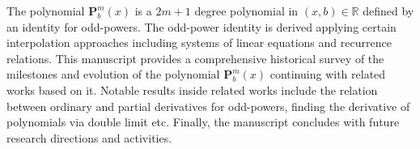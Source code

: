 The polynomial $\mathbf{P}^m_b(x)$ is a $2m+1$ degree polynomial in $(x,b) \in \mathbb{R}$
defined by an identity for odd-powers.
The odd-power identity is derived applying certain interpolation approaches
including systems of linear equations and recurrence relations.
This manuscript provides a comprehensive historical survey of the milestones and evolution of the polynomial
$\mathbf{P}^m_b(x)$ continuing with related works based on it.
Notable results inside related works include the relation between ordinary and partial derivatives for odd-powers,
finding the derivative of polynomials via double limit etc.
Finally, the manuscript concludes with future research directions and activities.

